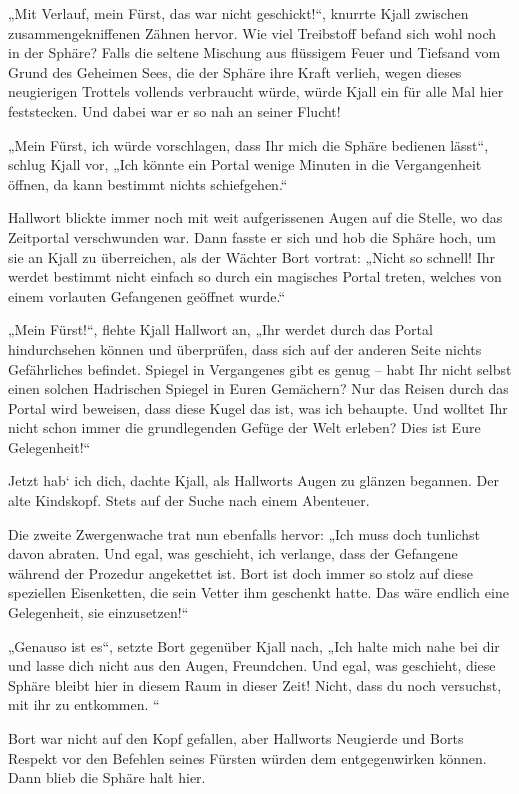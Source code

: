 „Mit Verlauf, mein Fürst, das war nicht geschickt!“, knurrte Kjall zwischen zusammengekniffenen Zähnen hervor. Wie viel Treibstoff befand sich wohl noch in der Sphäre? Falls die seltene Mischung aus flüssigem Feuer und Tiefsand vom Grund des Geheimen Sees, die der Sphäre ihre Kraft verlieh, wegen dieses neugierigen Trottels vollends verbraucht würde, würde Kjall ein für alle Mal hier feststecken. Und dabei war er so nah an seiner Flucht!

„Mein Fürst, ich würde vorschlagen, dass Ihr mich die Sphäre bedienen lässt“, schlug Kjall vor, „Ich könnte ein Portal wenige Minuten in die Vergangenheit öffnen, da kann bestimmt nichts schiefgehen.“

Hallwort blickte immer noch mit weit aufgerissenen Augen auf die Stelle, wo das Zeitportal verschwunden war. Dann fasste er sich und hob die Sphäre hoch, um sie an Kjall zu überreichen, als der Wächter Bort vortrat: „Nicht so schnell! Ihr werdet bestimmt nicht einfach so durch ein magisches Portal treten, welches von einem vorlauten Gefangenen geöffnet wurde.“

„Mein Fürst!“, flehte Kjall Hallwort an, „Ihr werdet durch das Portal hindurchsehen können und überprüfen, dass sich auf der anderen Seite nichts Gefährliches befindet. Spiegel in Vergangenes gibt es genug – habt Ihr nicht selbst einen solchen Hadrischen Spiegel in Euren Gemächern? Nur das Reisen durch das Portal wird beweisen, dass diese Kugel das ist, was ich behaupte. Und wolltet Ihr nicht schon immer die grundlegenden Gefüge der Welt erleben? Dies ist Eure Gelegenheit!“

Jetzt hab‘ ich dich, dachte Kjall, als Hallworts Augen zu glänzen begannen. Der alte Kindskopf. Stets auf der Suche nach einem Abenteuer.

Die zweite Zwergenwache trat nun ebenfalls hervor: „Ich muss doch tunlichst davon abraten. Und egal, was geschieht, ich verlange, dass der Gefangene während der Prozedur angekettet ist. Bort ist doch immer so stolz auf diese speziellen Eisenketten, die sein Vetter ihm geschenkt hatte. Das wäre endlich eine Gelegenheit, sie einzusetzen!“

„Genauso ist es“, setzte Bort gegenüber Kjall nach, „Ich halte mich nahe bei dir und lasse dich nicht aus den Augen, Freundchen. Und egal, was geschieht, diese Sphäre bleibt hier in diesem Raum in dieser Zeit! Nicht, dass du noch versuchst, mit ihr zu entkommen. “

Bort war nicht auf den Kopf gefallen, aber Hallworts Neugierde und Borts Respekt vor den Befehlen seines Fürsten würden dem entgegenwirken können. Dann blieb die Sphäre halt hier.


